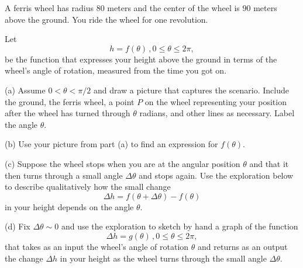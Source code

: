 \documentclass{ximera}
\begin{document}
\begin{question} \label{Q3:RightTriangle}
A ferris wheel has radius $80$ meters and the center of the wheel is $90$ meters above the ground. You ride the wheel for one revolution.

Let 
\[
    h = f(\theta) \, , 0\leq \theta \leq 2\pi ,
\]
be the function that expresses your height above the ground in terms of the wheel's angle of rotation, measured from the time you  got on.

(a)  Assume $0 < \theta < \pi/2$ and draw a picture that captures the scenario. Include the ground, the ferris wheel, a point $P$ on the wheel representing your position after the wheel has turned through $\theta$ radians, and other lines as necessary. Label the angle $\theta$.

(b) Use your picture from part (a) to find an expression for $f(\theta)$.

(c) Suppose the wheel stops when you are at the angular position $\theta$ and that it then turns through a small angle $\Delta \theta$ and stops again.  Use the exploration below to describe qualitatively how the small change
\[
    \Delta h = f(\theta + \Delta \theta) - f(\theta)
\]
in your height depends on the angle $\theta$. 

(d) Fix $\Delta \theta \sim 0$ and use the exploration to sketch by hand a graph of the function 
\[
     \Delta h = g(\theta) \, , 0\leq \theta \leq 2\pi ,
\]
that takes as an input the wheel's angle of rotation $\theta$ and returns as an output the change $\Delta h$
in your height as the wheel turns through the small angle $\Delta \theta$.

\begin{exploration}

 
\begin{onlineOnly}
    \begin{center}
\end{center}
\end{onlineOnly}
\end{exploration} 





\end{question}
\end{document}
